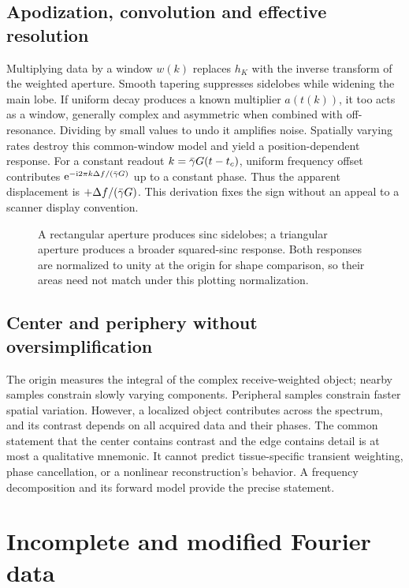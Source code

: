 \subsection{Apodization, convolution and effective resolution}
Multiplying data by a window \(w(k)\) replaces \(h_K\) with the inverse transform of the weighted aperture. Smooth tapering suppresses sidelobes while widening the main lobe. If uniform decay produces a known multiplier \(a(t(k))\), it too acts as a window, generally complex and asymmetric when combined with off-resonance. Dividing by small values to undo it amplifies noise. Spatially varying rates destroy this common-window model and yield a position-dependent response.
For a constant readout \(k=\bar{\gamma} G(t-t_c)\), uniform frequency offset contributes
\(\mathrm{e}^{-\mathrm{i}2\pi k\Delta f/(\bar{\gamma} G)}\) up to a constant phase. Thus the apparent displacement is \(+\Delta f/(\bar{\gamma} G)\). This derivation fixes the sign without an appeal to a scanner display convention.

\begin{figure}[tb]
\centering

\caption{A rectangular aperture produces sinc sidelobes; a triangular aperture produces a broader squared-sinc response. Both responses are normalized to unity at the origin for shape comparison, so their areas need not match under this plotting normalization.}
\label{fig:06:psf}
\end{figure}

\subsection{Center and periphery without oversimplification}
The origin measures the integral of the complex receive-weighted object; nearby samples constrain slowly varying components. Peripheral samples constrain faster spatial variation. However, a localized object contributes across the spectrum, and its contrast depends on all acquired data and their phases. The common statement that the center contains contrast and the edge contains detail is at most a qualitative mnemonic. It cannot predict tissue-specific transient weighting, phase cancellation, or a nonlinear reconstruction's behavior. A frequency decomposition and its forward model provide the precise statement.

\section{Incomplete and modified Fourier data}
\label{sec:06:incomplete-and-modified-fourier-data}
